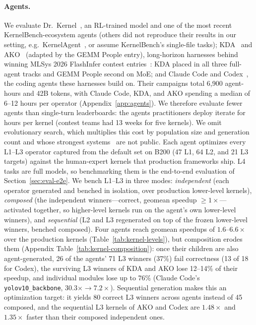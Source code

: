 \paragraph{Agents.}
We evaluate Dr.~Kernel~\citep{drkernel}, an RL-trained model and one of the most recent KernelBench-ecosystem agents (others did not reproduce their results in our setting, e.g.\ KernelAgent~\citep{kernelagent}, or assume KernelBench's single-file tasks); KDA~\citep{kda} and AKO~\citep{ako} (adapted by the GEMM People entry), long-horizon harnesses behind winning MLSys 2026 FlashInfer contest entries~\citep{mlsys26contest}: KDA placed in all three full-agent tracks and GEMM People second on MoE; and Claude Code and Codex~\citep{codex}, the coding agents these harnesses build on.
Their campaigns total 6{,}900 agent-hours and 42B tokens, with Claude Code, KDA, and AKO spending a median of 6--12 hours per operator (Appendix~\ref{app:agents}).
We therefore evaluate fewer agents than single-turn leaderboards: the agents practitioners deploy iterate for hours per kernel (contest teams had 13 weeks for five kernels).
We omit evolutionary search, which multiplies this cost by population size and generation count and whose strongest systems~\citep{alphaevolve,kernelevolve} are not public.
Each agent optimizes every L1--L3 operator captured from the default set on B200 (47 L1, 64 L2, and 21 L3 targets) against the human-expert kernels that production frameworks ship.
L4 tasks are full models, so benchmarking them is the end-to-end evaluation of Section~\ref{sec:eval-e2e}.
We bench L1--L3 in three modes:
\emph{independent} (each operator generated and benched in isolation, over production lower-level kernels),
\emph{composed} (the independent winners---correct, geomean speedup $\geq 1\times$---activated together, so higher-level kernels run on the agent's own lower-level winners), and
\emph{sequential} (L2 and L3 regenerated on top of the frozen lower-level winners, benched composed).
Four agents reach geomean speedups of $1.6$--$6.6\times$ over the production kernels (Table~\ref{tab:kernel-levels}), but composition erodes them (Appendix Table~\ref{tab:kernel-composition}): once their children are also agent-generated, 26 of the agents' 71 L3 winners (37\%) fail correctness (13 of 18 for Codex), the surviving L3 winners of KDA and AKO lose 12--14\% of their speedup, and individual modules lose up to 76\% (Claude Code's \texttt{yolov10\_backbone}, $30.3\times \to 7.2\times$).
Sequential generation makes this an optimization target: it yields 80 correct L3 winners across agents instead of 45 composed, and the sequential L3 kernels of AKO and Codex are $1.48\times$ and $1.35\times$ faster than their composed independent ones.

